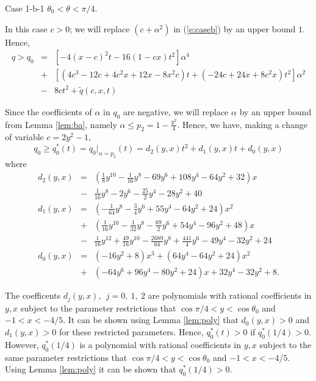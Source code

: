 \documentclass[12pt]{icgft}
\theoremstyle{definition}
\numberwithin{equation}{section}
\begin{document}
\vspace{0.1in}

Case 1-b-1 $\theta_0 < \theta < \pi/4$.

\vspace{0.1in}

In this case $c > 0$; we will replace $(c+\alpha^2)$ in (\ref{e:caseb}) by an upper bound $1$.  Hence,
\begin{eqnarray*}
q > q_0 &=& [-4(x-c)^2t - 16(1-cx)t^2]\alpha^4 \\
&+& [(4c^3-12c+4c^2x+12x-8x^2c)t + (-24c + 24x + 8c^2 x)t^2]\alpha^2 \\
&-&8ct^2 + {\tilde q}(c,x,t)
\end{eqnarray*}

Since the coefficients of $\alpha$ in $q_0$ are negative, we will replace $\alpha$ by an upper bound from Lemma \ref{lem:ba}, namely $\alpha \le p_2 = 1 -\frac{y^2}{4}$.  Hence, we have, making a change of variable $c=2y^2-1$,
$$q_0 \ge q_0^*(t) = {q_0}|_{\alpha=p_2}(t) = d_2(y,x)t^2 + d_1(y,x)t + d_0(y,x)$$
\noindent where
\begin{eqnarray*}
d_2(y,x) &=& (\frac{1}{8}y^{10} -\frac{1}{16}y^8 -69 y^6 + 108 y^4 - 64y^2 +32)x \\
&-&\frac{1}{16}y^8  -2y^6  -\frac{25}{2}y^4 -28y^2 + 40 \\
d_1(y,x) &=& (-\frac{1}{64}y^8 -\frac{3}{4}y^6 + 55y^4 - 64y^2 + 24)x^2 \\
 &+& (\frac{1}{16}y^{10}-\frac{1}{32}y^8 -\frac{69}{2}y^6 + 54y^4 - 96y^2 +48)x \\
 &-&\frac{1}{16}y^{12} +\frac{49}{16}y^{10} -\frac{2689}{64}y^8 + \frac{441}{4}y^6 -49y^4 -32y^2 + 24 \\
d_0(y,x) &=& (-16y^2 + 8)x^3 + (64y^4 - 64y^2 +24)x^2 \\
  &+& (-64y^6 +96y^4 -80y^2 +24)x +32y^4-32y^2 +8 .
\end{eqnarray*}

The coefficents $d_j(y,x), \ \  j=0,\ 1,\ 2$ are polynomials with rational coefficients in $y, x$ subject to the parameter restrictions that $\cos \pi/4 < y < \cos \theta_0$ and $-1 < x < -4/5$.  It can be shown using Lemma \ref{lem:poly} that $d_0(y,x) > 0$ and $d_1(y,x) > 0$ for these restricted parameters.  Hence, $q_0^*(t) > 0$ if $q_0^*(1/4) > 0$.  However, $q_0^*(1/4)$ is a polynomial with rational coefficients in $y, x$ subject to the same parameter restrictions that $\cos \pi/4 < y < \cos \theta_0$ and $-1 < x < -4/5$.  Using Lemma \ref{lem:poly} it can be shown that $q_0^*(1/4) > 0$.
\end{document}
